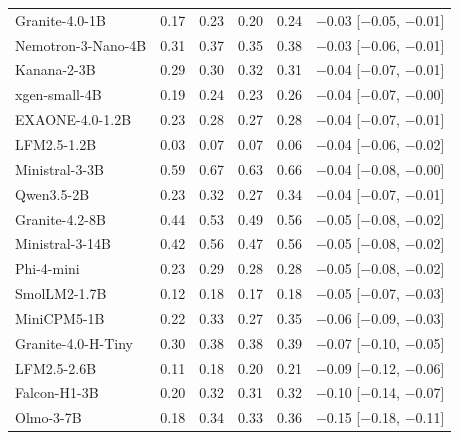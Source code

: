 \begin{tabular}{lccccc}
Granite-4.0-1B & 0.17 & 0.23 & 0.20 & 0.24 & $-$0.03 [$-$0.05, $-$0.01] \\
Nemotron-3-Nano-4B & 0.31 & 0.37 & 0.35 & 0.38 & $-$0.03 [$-$0.06, $-$0.01] \\
Kanana-2-3B & 0.29 & 0.30 & 0.32 & 0.31 & $-$0.04 [$-$0.07, $-$0.01] \\
xgen-small-4B & 0.19 & 0.24 & 0.23 & 0.26 & $-$0.04 [$-$0.07, $-$0.00] \\
EXAONE-4.0-1.2B & 0.23 & 0.28 & 0.27 & 0.28 & $-$0.04 [$-$0.07, $-$0.01] \\
LFM2.5-1.2B & 0.03 & 0.07 & 0.07 & 0.06 & $-$0.04 [$-$0.06, $-$0.02] \\
Ministral-3-3B & 0.59 & 0.67 & 0.63 & 0.66 & $-$0.04 [$-$0.08, $-$0.00] \\
Qwen3.5-2B & 0.23 & 0.32 & 0.27 & 0.34 & $-$0.04 [$-$0.07, $-$0.01] \\
Granite-4.2-8B & 0.44 & 0.53 & 0.49 & 0.56 & $-$0.05 [$-$0.08, $-$0.02] \\
Ministral-3-14B & 0.42 & 0.56 & 0.47 & 0.56 & $-$0.05 [$-$0.08, $-$0.02] \\
Phi-4-mini & 0.23 & 0.29 & 0.28 & 0.28 & $-$0.05 [$-$0.08, $-$0.02] \\
SmolLM2-1.7B & 0.12 & 0.18 & 0.17 & 0.18 & $-$0.05 [$-$0.07, $-$0.03] \\
MiniCPM5-1B & 0.22 & 0.33 & 0.27 & 0.35 & $-$0.06 [$-$0.09, $-$0.03] \\
Granite-4.0-H-Tiny & 0.30 & 0.38 & 0.38 & 0.39 & $-$0.07 [$-$0.10, $-$0.05] \\
LFM2.5-2.6B & 0.11 & 0.18 & 0.20 & 0.21 & $-$0.09 [$-$0.12, $-$0.06] \\
Falcon-H1-3B & 0.20 & 0.32 & 0.31 & 0.32 & $-$0.10 [$-$0.14, $-$0.07] \\
Olmo-3-7B & 0.18 & 0.34 & 0.33 & 0.36 & $-$0.15 [$-$0.18, $-$0.11] \\
\bottomrule
\end{tabular}
